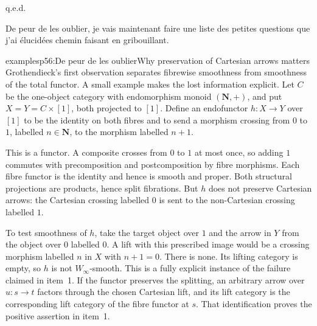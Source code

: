 \hfill q.e.d.

De peur de les oublier, je vais maintenant faire une liste des petites questions que j'ai élucidées chemin faisant en gribouillant.

\begin{dcomment}{examples}{p56:De peur de les oublier}{Why preservation of Cartesian arrows matters}
Grothendieck's first observation separates fibrewise smoothness from smoothness of the total functor. A small example makes the lost information explicit. Let $C$ be the one-object category with endomorphism monoid $(\mathbf N,+)$, and put $X=Y=C\times[1]$, both projected to $[1]$. Define an endofunctor $h:X\to Y$ over $[1]$ to be the identity on both fibres and to send a morphism crossing from $0$ to $1$, labelled $n\in\mathbf N$, to the morphism labelled $n+1$.

This is a functor. A composite crosses from $0$ to $1$ at most once, so adding $1$ commutes with precomposition and postcomposition by fibre morphisms. Each fibre functor is the identity and hence is smooth and proper. Both structural projections are products, hence split fibrations. But $h$ does not preserve Cartesian arrows: the Cartesian crossing labelled $0$ is sent to the non-Cartesian crossing labelled $1$.

To test smoothness of $h$, take the target object over $1$ and the arrow in $Y$ from the object over $0$ labelled $0$. A lift with this prescribed image would be a crossing morphism labelled $n$ in $X$ with $n+1=0$. There is none. Its lifting category is empty, so $h$ is not $W_\infty$-smooth. This is a fully explicit instance of the failure claimed in item~1. If the functor preserves the splitting, an arbitrary arrow over $u:s\to t$ factors through the chosen Cartesian lift, and its lift category is the corresponding lift category of the fibre functor at $s$. That identification proves the positive assertion in item~1.
\end{dcomment}


